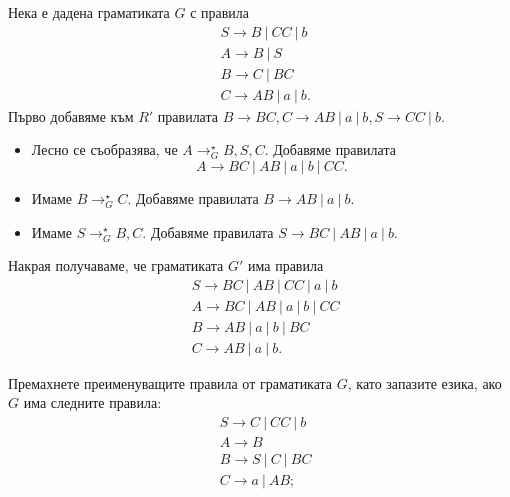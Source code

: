 \begin{example}
  Нека е дадена граматиката $G$ с правила  
  \begin{align*}
    & S \to B\ |\ CC\ |\ b\\
    & A \to B\ |\ S\\
    & B \to C\ |\ BC\\
    & C \to AB\ |\ a\ |\ b.
  \end{align*}
  Първо добавяме към $R'$ правилата $B \to BC, C \to AB\ |\ a\ |\ b, S \to CC\ |\ b$.
  \begin{itemize}
  \item 
    Лесно се съобразява, че $A \to^\star_G B,S,C$.
    Добавяме правилата 
    \[A \to BC\ |\ AB\ |\ a\ |\ b\ |\ CC.\]
  \item
    Имаме $B \to^\star_G C$.
    Добавяме правилата $B \to AB\ |\ a\ |\ b$.
  \item
    Имаме $S \to^\star_G B,C$.
    Добавяме правилата $S \to BC\ |\ AB\ |\ a\ |\ b$.
  \end{itemize}
  Накрая получаваме, че граматиката $G'$ има правила
  \begin{align*}
    & S \to BC\ |\ AB\ |\ CC\ |\ a\ |\ b\\
    & A \to BC\ |\ AB\ |\ a\ |\ b\ |\ CC\\
    & B \to AB\ |\ a\ |\ b\ |\ BC\\
    & C \to AB\ |\ a\ |\ b.
  \end{align*}
\end{example}

\begin{problem}
  Премахнете преименуващите правила от граматиката $G$, като запазите езика, ако $G$ има следните правила:
    \begin{align*}
      & S \to C\ |\ CC\ |\ b\\
      & A \to B\\
      & B \to S\ |\ C\ |\ BC\\
      & C \to a\ |\ AB;
    \end{align*}
\end{problem}

